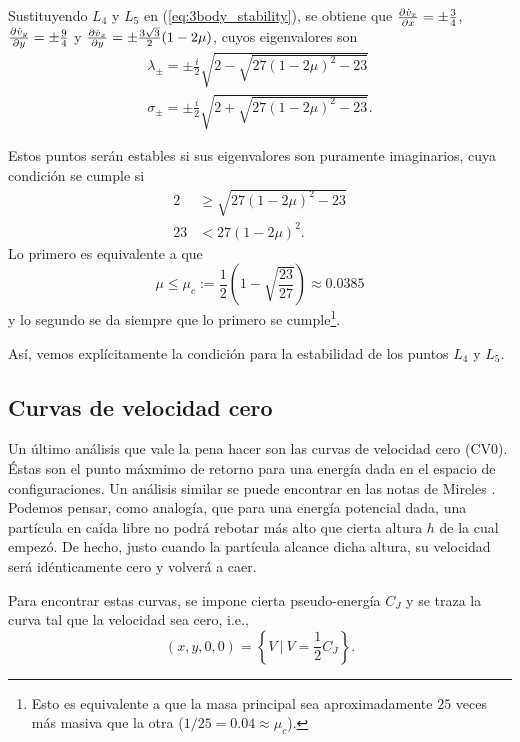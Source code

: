 Sustituyendo $L_4$ y $L_5$ en (\ref{eq:3body_stability}), se obtiene que $\frac{\partial \dot{v}_x}{\partial x} = \pm \frac{3}{4}$, $\frac{\partial \dot{v}_y}{\partial y} = \pm \frac{9}{4}$ y $\frac{\partial \dot{v}_x}{\partial y} = \pm \frac{3\sqrt{3}}{2} (1-2\mu) $, cuyos eigenvalores son
\begin{align*}
 \lambda_\pm = \pm \frac{i}{2} \sqrt{ 2 - \sqrt{27(1-2\mu)^2 - 23} } \\
 \sigma_\pm = \pm \frac{i}{2} \sqrt{ 2 + \sqrt{27(1-2\mu)^2 - 23} }.
 \end{align*}

Estos puntos serán estables si sus eigenvalores son puramente imaginarios, cuya condición se cumple si 
\begin{align*}
 2 &\geq \sqrt{27(1-2\mu)^2 - 23} \\
 23 &< 27(1-2\mu)^2.
\end{align*}
Lo primero es equivalente a que 
\begin{equation}
 \mu \leq \mu_c := \frac{1}{2} \left(1 - \sqrt{\frac{23}{27}} \right) \approx 0.0385
 \label{eq:mu_critica}
\end{equation}
y lo segundo se da siempre que lo primero se cumple\footnote{Esto es equivalente a que la masa principal sea aproximadamente $25$ veces más masiva que la otra ($1/25 = 0.04 \approx \mu_c$).}.

Así, vemos explícitamente la condición para la estabilidad de los puntos $L_4$ y $L_5$. 

\subsection{Curvas de velocidad cero}
\label{sec:zvc}

Un último análisis que vale la pena hacer son las curvas de velocidad cero (CV0). Éstas son el punto máxmimo de retorno para una energía dada en el espacio de configuraciones. Un análisis similar se puede encontrar en las notas de Mireles \cite{MirelesJames2006}. Podemos pensar, como analogía, que para una energía potencial dada, una partícula en caída libre no podrá rebotar más alto que cierta altura $h$ de la cual empezó. De hecho, justo cuando la partícula alcance dicha altura, su velocidad será idénticamente cero y volverá a caer. 

Para encontrar estas curvas, se impone cierta pseudo-energía $C_J$ y se traza la curva tal que la velocidad sea cero, i.e.,
\begin{equation*}
 (x,y,0,0) = \left\lbrace V \ | \  V = \frac{1}{2}C_J \right\rbrace.
\end{equation*}


